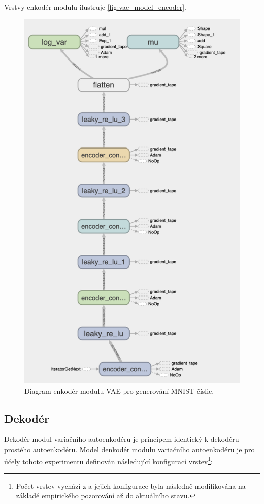 Vrstvy enkodér modulu ilustruje \autoref{fig:vae_model_encoder}.
\begin{figure}[H]
    \centering
    \includegraphics[height=0.63\textheight]{figures/vae_model_encoder.png}
    \caption{Diagram enkodér modulu VAE pro generování MNIST číslic.}
    \label{fig:vae_model_encoder}
\end{figure}

\subsection{Dekodér}
\label{sec:vae_model_decoder}
Dekodér modul variačního autoenkodéru je principem identický k dekodéru prostého autoenkodéru.
Model denkodér modulu variačního autoenkodéru je pro účely tohoto experimentu definován následující konfigurací vrstev\footnote{Počet vrstev vychází z \textcite{Kingma2014} a jejich konfigurace byla následně modifikována na základě empirického pozorování až do aktuálního stavu.}:

